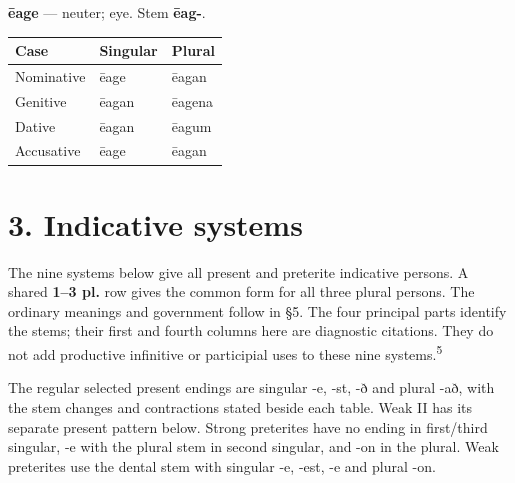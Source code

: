 \textbf{ēage} — neuter; eye. Stem \textbf{ēag-}.

\par\begingroup
\fontsize{10.5}{13.2}\selectfont
\setlength{\LTleft}{0pt}\setlength{\LTright}{\fill}
\noindent
\begin{tabular}{@{}>{\raggedright\arraybackslash}p{39.46mm}>{\raggedright\arraybackslash}p{39.46mm}>{\raggedright\arraybackslash}p{39.46mm}@{}}
\toprule
\textbf{Case} & \textbf{Singular} & \textbf{Plural} \\
\midrule
Nominative & ēage & ēagan \\
Genitive & ēagan & ēagena \\
Dative & ēagan & ēagum \\
Accusative & ēage & ēagan \\
\bottomrule
\end{tabular}
\par\endgroup

\section*{3. Indicative systems}

The nine systems below give all present and preterite indicative persons. A shared \textbf{1–3 pl.} row gives the common form for all three plural persons. The ordinary meanings and government follow in §5. The four principal parts identify the stems; their first and fourth columns here are diagnostic citations. They do not add productive infinitive or participial uses to these nine systems.\textsuperscript{5}

The regular selected present endings are singular -e, -st, -ð and plural -að, with the stem changes and contractions stated beside each table. Weak II has its separate present pattern below. Strong preterites have no ending in first/\allowbreak{}third singular, -e with the plural stem in second singular, and -on in the plural. Weak preterites use the dental stem with singular -e, -est, -e and plural -on.

